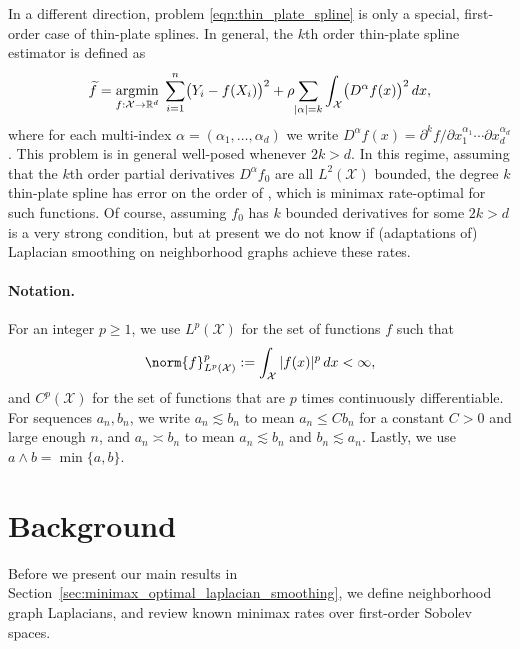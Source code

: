 \documentclass[twoside]{article}
\newcommand{\red}[1]{\textcolor{red}{#1}}
\newcommand{\green}[1]{\textcolor{green}{#1}}
\newcommand{\sbcomment}[1]{{\bf{{\red{{SB --- #1}}}}}}
\newcommand{\agcomment}[1]{{\bf{{\green{{AG --- #1}}}}}}
\newcommand{\Reals}{\mathbb{R}}
\newcommand{\1}{\mathbf{1}}
\DeclareMathOperator*{\argmin}{argmin}
\newcommand{\Rd}{\Reals^d}
\newcommand{\Xset}{\mathcal{X}}
\newcommand{\Leb}{L}
\newcommand{\wt}[1]{\widetilde{#1}}
\theoremstyle{definition}
\theoremstyle{remark}
\begin{document}
In a different direction, problem \eqref{eqn:thin_plate_spline} is only a special, first-order case of thin-plate splines. In general, the $k$th order thin-plate spline estimator is defined as
\begin{equation*}
\wt{f} = \argmin_{f : \Xset \to \Rd} \; \sum_{i = 1}^{n} \bigl(Y_i - f(X_i)\bigr)^2 + \rho \hspace{-2pt} \sum_{|\alpha| = k} \int_{\Xset} \bigl(D^\alpha f(x)\bigr)^2 \,dx,
\end{equation*}
where for each multi-index $\alpha=(\alpha_1,\ldots,\alpha_d)$ we write $D^\alpha f(x) = \partial^kf/\partial x_{1}^{\alpha_1} \cdots \partial x_{d}^{\alpha_d}$. This problem is in general well-posed whenever $2k > d$. In this regime, assuming that the $k$th order partial derivatives $D^\alpha f_0$ are all $\Leb^2(\Xset)$ bounded, the degree $k$ thin-plate spline has error on the order of  \citep{vandergeer2000}, which is minimax rate-optimal for such functions. Of course, assuming $f_0$ has $k$ bounded derivatives for some $2k > d$ is a very strong condition, but at present we do not know if (adaptations of) Laplacian smoothing on neighborhood graphs achieve these rates.

\paragraph{Notation.}

For an integer $p \geq 1$, we use $\Leb^p(\Xset)$ for the set of functions $f$ such that 
\begin{equation*}
\norm{f}_{\Leb^p(\Xset)}^p := \int_{\Xset} |f(x)|^p \,dx < \infty,
\end{equation*}
and $C^p(\Xset)$ for the set of functions that are $p$ times continuously differentiable. For sequences $a_n,b_n$, we write $a_n \lesssim b_n$ to mean $a_n \leq Cb_n$ for a constant $C>0$ and large enough $n$, and $a_n \asymp b_n$ to mean $a_n \lesssim b_n$ and $b_n \lesssim a_n$. Lastly, we use $a \wedge b = \min\{a,b\}$.
\\

\section{Background}
\label{sec:problem_setup_and_background}

Before we present our main results in Section~\ref{sec:minimax_optimal_laplacian_smoothing}, we define neighborhood graph Laplacians, and review known minimax rates over first-order Sobolev spaces.
\end{document}
